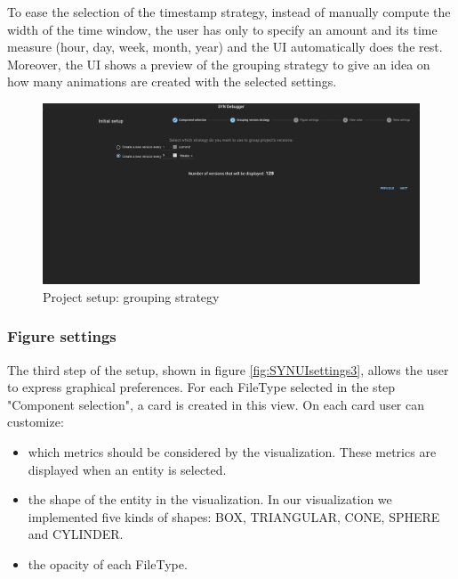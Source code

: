 To ease the selection of the timestamp strategy, instead of manually compute the width of the time window, the user has only to specify an amount and its time measure (hour, day, week, month, year) and the UI automatically does the rest. 
Moreover, the UI shows a preview of the grouping strategy to give an idea on how many animations are created with the selected settings. 
\begin{figure}
    \center
    \includegraphics[width=\textwidth]{SYNUI-settings2.png}
    \caption{Project setup: grouping strategy}
    \label{fig:SYNUIsettings2}
\end{figure}

\subsubsection*{Figure settings}
The third step of the setup, shown in figure \ref{fig:SYNUIsettings3}, allows the user to express graphical preferences. 
For each FileType selected in the step "Component selection", a card is created in this view. 
On each card user can customize:
\begin{itemize}
    \item which metrics should be considered by the visualization. These metrics are displayed when an entity is selected.
    \item the shape of the entity in the visualization. In our visualization we implemented five kinds of shapes: BOX, TRIANGULAR, CONE, SPHERE and CYLINDER. 
    \item the opacity of each FileType. 
\end{itemize}

